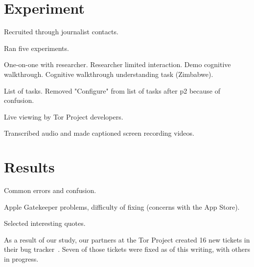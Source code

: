 
\section{Experiment}

Recruited through journalist contacts.

Ran five experiments.

One-on-one with researcher.
Researcher limited interaction.
Demo cognitive walkthrough.
Cognitive walkthrough understanding task (Zimbabwe).

List of tasks.
Removed "Configure" from list of tasks after p2 because of confusion.

Live viewing by Tor Project developers.

Transcribed audio and made captioned screen recording videos.


\section{Results}

Common errors and confusion.

Apple Gatekeeper problems,
difficulty of fixing (concerns with the App Store).

Selected interesting quotes.

As a result of our study,
our partners at the Tor Project created 16 new tickets in their bug tracker~\cite{uxsprint2015-tickets}.
Seven of those tickets were fixed as of this writing,
with others in progress.
